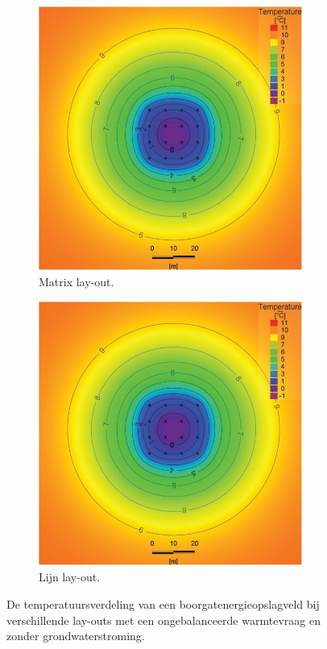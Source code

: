 \documentclass[a4paper,oneside,11pt]{report}
\numberwithin{figure}{section}
\numberwithin{table}{section}
\numberwithin{equation}{section}
\begin{document}
\begin{figure}[hbtp] 
\begin{subfigure}{0.4\textwidth}
	\centering
	\includegraphics[width=0.95\textwidth]{invlf_fig8a.jpg}
	\caption{Matrix lay-out.}
\end{subfigure}%
\begin{subfigure}{0.4\textwidth}
	\centering
	\includegraphics[width=0.95\textwidth]{invlf_fig8a.jpg}
	\caption{Lijn lay-out.}
\end{subfigure}%
\label{fig:invlf_8}
\centering
\caption{De temperatuursverdeling van een boorgatenergieopslagveld bij verschillende lay-outs met een ongebalanceerde warmtevraag en zonder grondwaterstroming.}
\end{figure}
\end{document}
